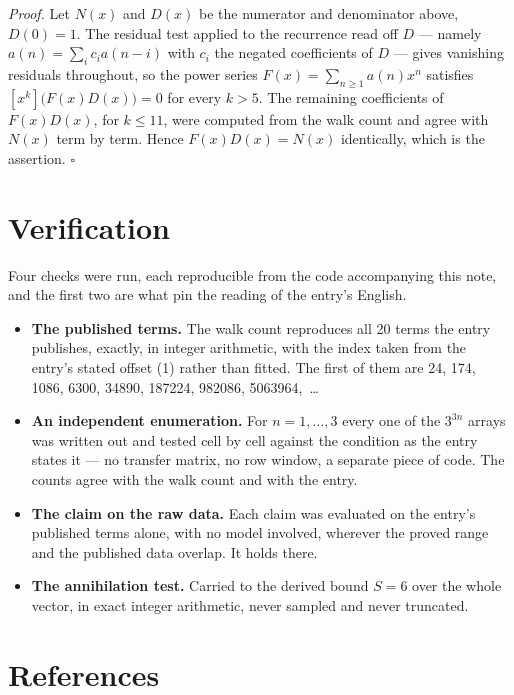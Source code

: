 \documentclass[11pt]{article}
\theoremstyle{definition}
\begin{document}
{\itshape Proof.} Let $N(x)$ and $D(x)$ be the numerator and denominator above, $D(0)=1$. The residual test applied to the recurrence read off $D$ --- namely $a(n) = \sum_i c_i a(n-i)$ with $c_i$ the negated coefficients of $D$ --- gives vanishing residuals throughout, so the power series $F(x)=\sum_{n\ge 1}a(n)x^n$ satisfies $[x^k]\bigl(F(x)D(x)\bigr) = 0$ for every $k > 5$. The remaining coefficients of $F(x)D(x)$, for $k \le 11$, were computed from the walk count and agree with $N(x)$ term by term. Hence $F(x)D(x) = N(x)$ identically, which is the assertion. $\square$

\section{Verification}

Four checks were run, each reproducible from the code accompanying this note, and the first two are what pin the reading of the entry's English.

\begin{itemize}

\item {\bfseries The published terms.} The walk count reproduces all 20 terms the entry publishes, exactly, in integer arithmetic, with the index taken from the entry's stated offset (1) rather than fitted. The first of them are 24, 174, 1086, 6300, 34890, 187224, 982086, 5063964,~\dots

\item {\bfseries An independent enumeration.} For $n = 1,\dots,3$ every one of the $3^{3n}$ arrays was written out and tested cell by cell against the condition as the entry states it --- no transfer matrix, no row window, a separate piece of code. The counts agree with the walk count and with the entry.

\item {\bfseries The claim on the raw data.} Each claim was evaluated on the entry's published terms alone, with no model involved, wherever the proved range and the published data overlap. It holds there.

\item {\bfseries The annihilation test.} Carried to the derived bound $S = 6$ over the whole vector, in exact integer arithmetic, never sampled and never truncated.

\end{itemize}

\section{References}
\end{document}
